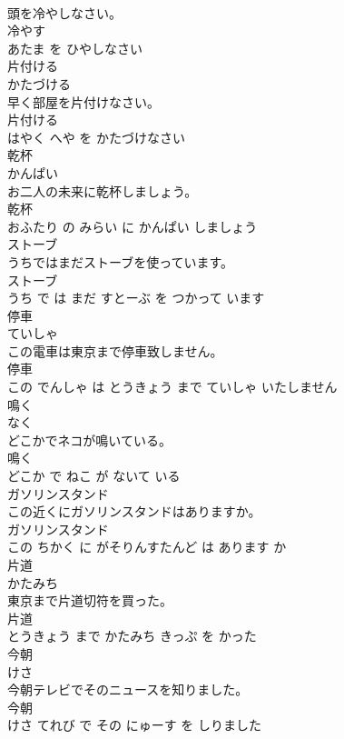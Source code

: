 \documentclass[8pt]{extreport}
\begin{document}
\begin{CJK}{UTF8}{min}
\\	頭を冷やしなさい。	
\\	冷やす 
\\	あたま を ひやしなさい			
\\	片付ける	
\\	かたづける			
\\	早く部屋を片付けなさい。	
\\	片付ける 
\\	はやく へや を かたづけなさい			
\\	乾杯	
\\	かんぱい			
\\	お二人の未来に乾杯しましょう。	
\\	乾杯 
\\	おふたり の みらい に かんぱい しましょう			
\\	ストーブ	
\\	うちではまだストーブを使っています。	
\\	ストーブ 
\\	うち で は まだ すとーぶ を つかって います			
\\	停車	
\\	ていしゃ			
\\	この電車は東京まで停車致しません。	
\\	停車 
\\	この でんしゃ は とうきょう まで ていしゃ いたしません			
\\	鳴く	
\\	なく			
\\	どこかでネコが鳴いている。	
\\	鳴く 
\\	どこか で ねこ が ないて いる			
\\	ガソリンスタンド	
\\	この近くにガソリンスタンドはありますか。	
\\	ガソリンスタンド 
\\	この ちかく に がそりんすたんど は あります か			
\\	片道	
\\	かたみち			
\\	東京まで片道切符を買った。	
\\	片道 
\\	とうきょう まで かたみち きっぷ を かった			
\\	今朝	
\\	けさ			
\\	今朝テレビでそのニュースを知りました。	
\\	今朝 
\\	けさ てれび で その にゅーす を しりました			

\end{CJK}
\end{document}
